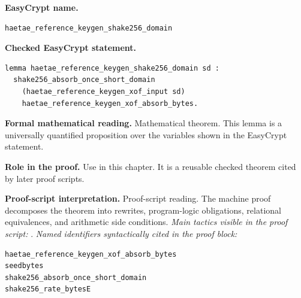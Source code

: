 \begin{formaltheorem}
\noindent\textbf{EasyCrypt name.}
\begin{lstlisting}[language=EasyCrypt,basicstyle=\ttfamily\scriptsize]
haetae_reference_keygen_shake256_domain
\end{lstlisting}
\noindent\textbf{Checked EasyCrypt statement.}
\begin{lstlisting}[language=EasyCrypt,basicstyle=\ttfamily\scriptsize]
lemma haetae_reference_keygen_shake256_domain sd :
  shake256_absorb_once_short_domain
    (haetae_reference_keygen_xof_input sd)
    haetae_reference_keygen_xof_absorb_bytes.
\end{lstlisting}
\noindent\textbf{Formal mathematical reading.}
Mathematical theorem. This lemma is a universally quantified proposition over the variables shown in the EasyCrypt statement.

\noindent\textbf{Role in the proof.}
Use in this chapter. It is a reusable checked theorem cited by later proof scripts.

\noindent\textbf{Proof-script interpretation.}
Proof-script reading. The machine proof decomposes the theorem into rewrites, program-logic obligations, relational equivalences, and arithmetic side conditions.
\emph{Main tactics visible in the proof script:} .
\emph{Named identifiers syntactically cited in the proof block:}
\begin{lstlisting}[language=EasyCrypt,basicstyle=\ttfamily\scriptsize]
haetae_reference_keygen_xof_absorb_bytes
seedbytes
shake256_absorb_once_short_domain
shake256_rate_bytesE
\end{lstlisting}

\end{formaltheorem}

